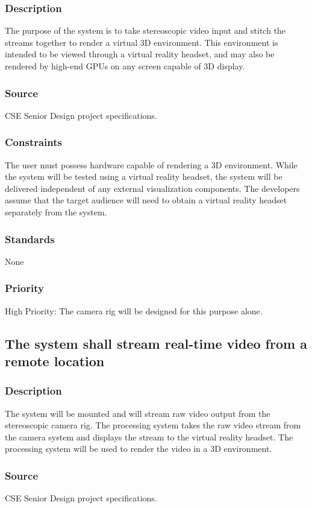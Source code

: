 \subsubsection{Description}
The purpose of the system is to take stereoscopic video input and stitch the streams together to render a virtual 3D environment. This environment is intended to be viewed through a virtual reality headset, and may also be rendered by high-end GPUs on any screen capable of 3D display. 
\subsubsection{Source}
CSE Senior Design project specifications.
\subsubsection{Constraints}
The user must possess hardware capable of rendering a 3D environment. While the system will be tested using a virtual reality headset, the system will be delivered independent of any external visualization components. The developers assume that the target audience will need to obtain a virtual reality headset separately from the system.  
\subsubsection{Standards}
None
\subsubsection{Priority}
High Priority: The camera rig will be designed for this purpose alone. 

\subsection{The system shall stream real-time video from a remote location}
\subsubsection{Description}
The system will be mounted and will stream raw video output from the stereoscopic camera rig. The processing system takes the raw video stream from the camera system and displays the stream to the virtual reality headset. The processing system will be used to render the video in a 3D environment. 
\subsubsection{Source}
CSE Senior Design project specifications.
